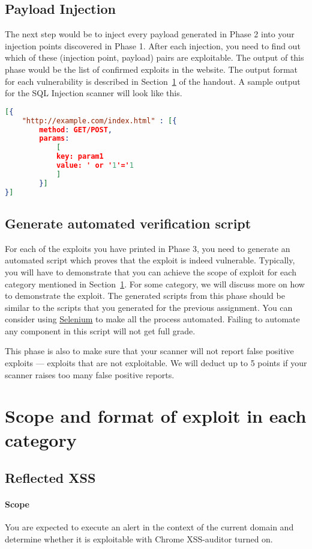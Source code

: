 \documentclass{article}[10pt]
\begin{document}
\subsection{Payload Injection}
The next step would be to inject every payload generated in Phase 2 into your injection points discovered in Phase 1. After each injection, you need to find out which of these (injection point, payload) pairs are exploitable. The output of this phase would be the list of confirmed exploits in the website. The output format for each vulnerability is described in Section~\ref{exploit-format} of the handout. A sample output for the SQL Injection scanner will look like this.
\begin{lstlisting}[language=json,firstnumber=1]
[{
	"http://example.com/index.html" : [{
		method: GET/POST,
		params: 
			[
			key: param1
			value: ' or '1'='1
			]
		}]
}]
\end{lstlisting}

\subsection{Generate automated verification script} 
For each of the exploits you have printed in Phase 3, you need to generate an
automated script which proves that the exploit is indeed vulnerable. Typically, you will have to demonstrate that you can achieve the scope of exploit for each category mentioned in Section~\ref{exploit-format}. For some category, we will discuss more on how to demonstrate the exploit. The
generated scripts from this phase should be similar to the scripts that you
generated for the previous assignment. You can consider using
\href{http://www.seleniumhq.org/}{Selenium} to make all the process automated.
Failing to automate any component in this script will not get full grade.

This phase is also to make sure that your scanner will not report false positive exploits --- exploits that are not exploitable. We will deduct up to 5 points if your scanner raises too many false positive reports.

\section{Scope and format of exploit in each category}
\label{exploit-format}
\subsection{Reflected XSS}
\paragraph{Scope} You are expected to execute an alert in the context of the current domain and determine whether it is exploitable with Chrome XSS-auditor turned on. 
\end{document}
